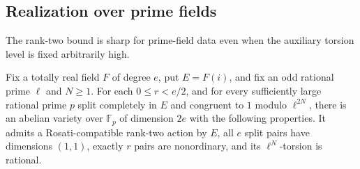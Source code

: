 \subsection{Realization over prime fields}

The rank-two bound is sharp for prime-field data even when the
auxiliary torsion level is fixed arbitrarily high.

\begin{proposition}\label{prop:sharpness}
Fix a totally real field \(F\) of degree \(e\), put \(E=F(i)\),
and fix an odd rational prime \(\ell\) and \(N\ge1\). For each
\(0\le r<e/2\), and for every sufficiently large rational prime
\(p\) split completely in \(E\) and congruent to \(1\) modulo
\(\ell^{2N}\), there is an abelian variety over \(\mathbb F_p\)
of dimension \(2e\) with the following properties. It admits a
Rosati-compatible rank-two action by \(E\), all \(e\) split pairs
have dimensions \((1,1)\), exactly \(r\) pairs are nonordinary,
and its \(\ell^N\)-torsion is rational.
\end{proposition}

